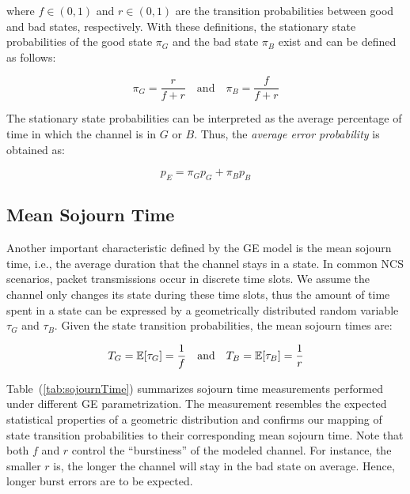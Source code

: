 where $f\in(0,1)$ and $r\in(0,1)$ are the transition probabilities between good
and bad states, respectively. With these definitions, the stationary state
probabilities of the good state $\pi_G$ and the bad state $\pi_B$ exist and can
be defined as follows:

\begin{equation}
  \pi_G = \frac{r}{f+r} \quad \textrm{and} \quad \pi_B = \frac{f}{f+r}
\end{equation}

The stationary state probabilities can be interpreted as the average percentage
of time in which the channel is in $G$ or $B$. Thus, the \textit{average error
probability} is obtained as:

\begin{equation}
  p_E = \pi_G p_G + \pi_B p_B
  \label{eq:avgLoss}
\end{equation}

\subsection{Mean Sojourn Time}
Another important characteristic defined by the GE model is the mean sojourn
time, i.e., the average duration that the channel stays in a state. In common
NCS scenarios, packet transmissions occur in discrete time slots. We assume the
channel only changes its state during these time slots, thus the amount of time
spent in a state can be expressed by a geometrically distributed random variable
$\tau_G$ and $\tau_B$. Given the state transition probabilities, the mean
sojourn times are:

\begin{equation}
  T_G = \mathbb{E}[\tau_G] = \frac{1}{f} \quad \textrm{and} \quad T_B = \mathbb{E}[\tau_B] = \frac{1}{r}
\end{equation}

Table~(\ref{tab:sojournTime}) summarizes sojourn time measurements performed
under different GE parametrization. The measurement resembles the expected
statistical properties of a geometric distribution and confirms our mapping of
state transition probabilities to their corresponding mean sojourn time. Note
that both $f$ and $r$ control the ``burstiness'' of the modeled channel. For
instance, the smaller $r$ is, the longer the channel will stay in the bad state
on average. Hence, longer burst errors are to be expected. 

